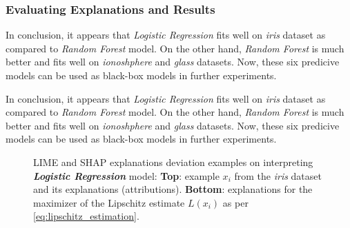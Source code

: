 \documentclass[english]{tktltiki2}
\theoremstyle{definition}
\theoremstyle{remark}
\begin{document}
\subsubsection{Evaluating Explanations and Results}


In conclusion, it appears that \textit{Logistic Regression} fits well on \textit{iris} dataset as compared to \textit{Random Forest} model. On the other hand, \textit{Random Forest} is much better and fits well on \textit{ionoshphere} and \textit{glass} datasets. Now, these six predicive models can be used as black-box models in further experiments.

In conclusion, it appears that \textit{Logistic Regression} fits well on \textit{iris} dataset as compared to \textit{Random Forest} model. On the other hand, \textit{Random Forest} is much better and fits well on \textit{ionoshphere} and \textit{glass} datasets. Now, these six predicive models can be used as black-box models in further experiments.

\begin{figure}[H]
	\vspace*{-5mm}
	\centering
	\qquad
	\caption{{LIME and SHAP explanations deviation examples on interpreting \textbf{\textit{Logistic Regression}} model: \textbf{Top}: example $x_i$ from the \textit{iris} dataset and its explanations (attributions). \textbf{Bottom}: explanations for the maximizer of the Lipschitz estimate $L(x_i)$ as per \eqref{eq:lipschitz_estimation}.}}%
	\label{fig:iris_rf_deviation_stability}%
\end{figure}
\end{document}
